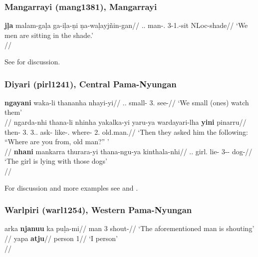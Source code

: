 \subsubsection{Mangarrayi (mang1381), Mangarrayi}

\ex
\begingl
\gla \textbf{\ng{}j\d{l}a} malam-ga\d{l}a ga-\ng{}i\d{l}a-\d{n}i \d{n}a-wa\d{l}ayjñin-gan//
\Pl.\Excl.\Nom{} man-\Pl.\Nom{} 3-1\Pl.\Excl-sit NLoc-shade//
\glft `We men are sitting in the shade.'\\\citep[103]{merlan1989}//
\endgl
\xe

See \citealp[103; 203]{merlan1989} for discussion.


\newpage
\subsubsection{Diyari (pirl1241), Central Pama-Nyungan}


\pex 
\a \begingl
\gla \textbf{ngayani} waka-li thananha nhayi-yi//
\Pl.\Excl.\Nom{} small-\Erg{} 3\Pl.\Acc{} see-\Prs{}//
\glft `We small (ones) watch them'\\\citep[102, (106)]{austin2013}//
\endgl
\a 
\begingl
\gla ngarda-nhi thana-li nhinha yakalka-yi yaru-ya wardayari-lha \textbf{yini} pinarru//
\glb then-\Loc{} 3\Pl.\Erg{} 3\Sg.\Nf.\Acc{} ask-\Prs{} like-\Dem.\Prox{} where-\Char{} 2\Sg.\Nom{} old.man.\Nom//
\glft `Then they asked him the following: ``Where are you from, old man?'' '\\\citep[119, (175)]{austin2013}//
\endgl
\a\begingl
\gla \textbf{nhani} mankarra thurara-yi thana-ngu-ya kinthala-nhi//
\Sg.\F.\Nom{} girl.\Nom{} lie-\Prs{} 3\Pl-\Loc-\Prox{} dog-\Loc{}//
\glft `The girl is lying with those dogs'\\\citep[150, (311)]{austin2013}//
\endgl
\xe


For discussion and more examples see \citet[97f.]{austin1981} and \citep[100--103, 119, 150]{austin2013}.

\subsubsection{Warlpiri (warl1254), Western Pama-Nyungan}

\pex \a 
\begingl
\gla \ng{}arka \textbf{njanu\ng{}u} ka pu\d{l}a-mi//
\glb man 3 \Prs{} shout-\Npst{}//
\glft `The aforementioned man is shouting'\\\citep[316, (22)]{hale1973}//
\endgl
\a
\begingl
\gla yapa \textbf{\ng{}atju}//
\glb person 1\Sg{}//
\glft `I person'\\\citep[317]{hale1973}//
\endgl
\xe

